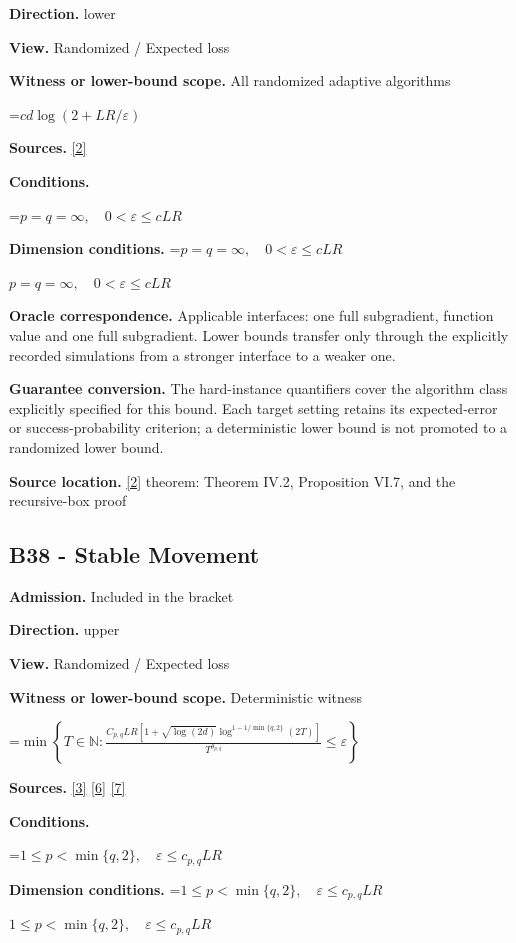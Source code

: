 \documentclass[10pt,a4paper]{article}
\newcommand{\AtlasMath}[1]{\par\begingroup\centering\setbox0=\hbox{$\displaystyle #1$}\ifdim\wd0>1.4\linewidth\typeout{ATLAS WIDE FORMULA: \the\wd0}\fi\ifdim\wd0>\linewidth\resizebox{\linewidth}{!}{\box0}\else\box0\fi\par\endgroup}
\newcommand{\AtlasInlineMath}[1]{\begingroup\setbox0=\hbox{$#1$}\ifdim\wd0>.4\linewidth\endgroup\AtlasMath{#1}\else\endgroup$#1$\fi}
\begin{document}
\textbf{Direction.} lower

\textbf{View.} Randomized / Expected loss

\textbf{Witness or lower-bound scope.} All randomized adaptive algorithms

\AtlasMath{cd\log(2+LR/\varepsilon)}
\textbf{Sources.} \href{https://arxiv.org/pdf/1407.5144}{[2]}

\textbf{Conditions.} 
\AtlasMath{p=q=\infty,\quad0<\varepsilon\le cLR}


\textbf{Dimension conditions.} \AtlasInlineMath{p=q=\infty,\quad0<\varepsilon\le cLR}

\textbf{Oracle correspondence.} Applicable interfaces: one full subgradient, function value and one full subgradient. Lower bounds transfer only through the explicitly recorded simulations from a stronger interface to a weaker one.

\textbf{Guarantee conversion.} The hard-instance quantifiers cover the algorithm class explicitly specified for this bound. Each target setting retains its expected-error or success-probability criterion; a deterministic lower bound is not promoted to a randomized lower bound.

\textbf{Source location.} \href{https://arxiv.org/pdf/1407.5144}{[2]} theorem: Theorem IV.2, Proposition VI.7, and the recursive-box proof

\subsection{B38 - Stable Movement}
\textbf{Admission.} Included in the bracket

\textbf{Direction.} upper

\textbf{View.} Randomized / Expected loss

\textbf{Witness or lower-bound scope.} Deterministic witness

\AtlasMath{\min\left\{T\in\mathbb{N}:\frac{C_{p,q}LR[1+\sqrt{\log(2d)}\log^{1-1/\min\{q,2\}}(2T)]}{T^{\theta_{p,q}}}\le\varepsilon\right\}}
\textbf{Sources.} \href{https://arxiv.org/pdf/2609.20701}{[3]} \href{https://arxiv.org/pdf/1405.4980}{[6]} \href{https://www2.isye.gatech.edu/~nemirovs/MOR_AccuracyCertificates.pdf}{[7]}

\textbf{Conditions.} 
\AtlasMath{1\le p<\min\{q,2\},\quad\varepsilon\le c_{p,q}LR}


\textbf{Dimension conditions.} \AtlasInlineMath{1\le p<\min\{q,2\},\quad\varepsilon\le c_{p,q}LR}
\end{document}
